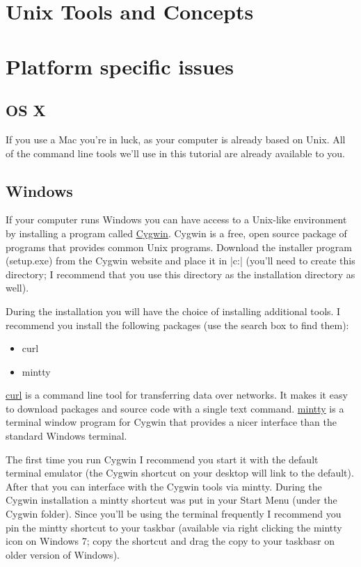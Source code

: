 
\section{Unix Tools and Concepts}


\section{Platform specific issues}

\subsection{OS X}
If you use a Mac you're in luck, as your computer is already based on Unix.  All of the command line tools we'll use in this tutorial are already available to you.

\subsection{Windows}

If your computer runs Windows you can have access to a Unix-like environment by installing a program called \href{http://www.cygwin.com}{Cygwin}.  Cygwin is a free, open source package of programs that provides common Unix programs.  Download the installer program (setup.exe) from the Cygwin website and place it in |c:\cygwin| (you'll need to create this directory; I recommend that you use this directory as the installation directory as well).  

During the installation you will have the choice of installing additional tools. I recommend you install the following packages (use the search box to find them):
\begin{itemize}
    \item curl
    \item mintty
\end{itemize}

\href{http://curl.haxx.se/}{curl} is a command line tool for transferring data over networks. It makes it easy to download packages and source code with a single text command. \href{http://code.google.com/p/mintty/}{mintty} is a terminal window program for Cygwin that provides a nicer interface than the standard Windows terminal. 

The first time you run Cygwin I recommend you start it with the default terminal emulator (the Cygwin shortcut on your desktop will link to the default). After that you can interface with the Cygwin tools via mintty. During the Cygwin installation a mintty shortcut was put in your Start Menu (under the Cygwin folder).  Since you'll be using the terminal frequently I recommend you pin the mintty shortcut to your taskbar (available via right clicking the mintty icon on Windows 7; copy the shortcut and drag the copy to your taskbasr on older version of Windows).

